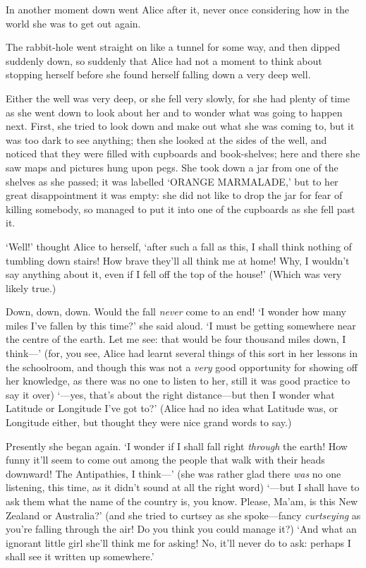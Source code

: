 \documentclass[12pt,openany]{memoir}
\begin{document}
In another moment down went Alice after it, never once considering how in the world she was to get out again.

The rabbit-hole went straight on like a tunnel for some way, and then dipped suddenly down, so suddenly that Alice had not a moment to think about stopping herself before she found herself falling down a very deep well.

Either the well was very deep, or she fell very slowly, for she had plenty of time as she went down to look about her and to wonder what was going to happen next. First, she tried to look down and make out what she was coming to, but it was too dark to see anything; then she looked at the sides of the well, and noticed that they were filled with cupboards and book-shelves; here and there she saw maps and pictures hung upon pegs. She took down a jar from one of the shelves as she passed; it was labelled `ORANGE MARMALADE,' but to her great disappointment it was empty: she did not like to drop the jar for fear of killing somebody, so managed to put it into one of the cupboards as she fell past it.

`Well!' thought Alice to herself, `after such a fall as this, I shall think nothing of tumbling down stairs! How brave they'll all think me at home! Why, I wouldn't say anything about it, even if I fell off the top of the house!' (Which was very likely true.)

Down, down, down. Would the fall \textit{never} come to an end! `I wonder how many miles I've fallen by this time?' she said aloud. `I must be getting somewhere near the centre of the earth. Let me see: that would be four thousand miles down, I think---' (for, you see, Alice had learnt several things of this sort in her lessons in the schoolroom, and though this was not a \textit{very} good opportunity for showing off her knowledge, as there was no one to listen to her, still it was good practice to say it over) `---yes, that's about the right distance---but then I wonder what Latitude or Longitude I've got to?' (Alice had no idea what Latitude was, or Longitude either, but thought they were nice grand words to say.)

Presently she began again. `I wonder if I shall fall right \textit{through} the earth! How funny it'll seem to come out among the people that walk with their heads downward! The Antipathies, I think---' (she was rather glad there \textit{was} no one listening, this time, as it didn't sound at all the right word) `---but I shall have to ask them what the name of the country is, you know. Please, Ma'am, is this New Zealand or Australia?' (and she tried to curtsey as she spoke---fancy \textit{curtseying} as you're falling through the air! Do you think you could manage it?) `And what an ignorant little girl she'll think me for asking! No, it'll never do to ask: perhaps I shall see it written up somewhere.'
\end{document}
